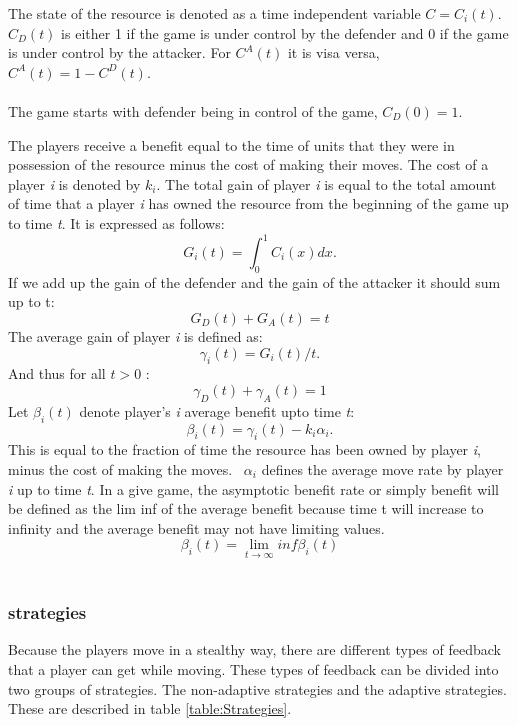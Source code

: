The state of the resource is denoted as a time independent variable $C=C_{i}(t)$. 
$C_{D}(t)$ is either 1 if the game is under control by the defender and 0 if the game is under control by the attacker. For $C^{A}(t)$ it is visa versa, $C^{A}(t)= 1 - C^{D}(t)$.\\ \\
The game starts with defender being in control of the game, $C_{D}(0)= 1$. 

The players receive a benefit equal to the time of units that they were in possession of the resource minus the cost of making their moves. The cost of a player \textit{i} is denoted by $k_{i}$. 
The total gain of player \textit{i} is equal to the total amount of time that a player \textit{i} has owned the resource from the beginning of the game up to time \textit{t}. It is expressed as follows:
\begin{equation}\label{first}
G_{i}(t) = \int_0^1 \! C_{i}(x) dx.
\end{equation}
If we add up the gain of the defender and the gain of the attacker it should sum up to t:
\begin{equation}\label{first}
G_{D}(t) + G_{A}(t) = t
\end{equation}
The average gain of player \textit{i} is defined as:
\begin{equation}\label{first}
\gamma_{i}(t) = G_{i}(t)/t.
\end{equation}
And thus for all $t > 0$ :
\begin{equation}\label{first}
\gamma_{D}(t) + \gamma_{A}(t) = 1
\end{equation}
Let $\beta_{i}(t)$ denote player's \textit{i} average benefit upto time \textit{t}:
\begin{equation}\label{first}
\beta_{i}(t) = \gamma_{i}(t) - k_{i}\alpha_{i}.
\end{equation}
This is equal to the fraction of time the resource has been owned by player \textit{i}, minus the cost of making the moves. ~$ \alpha_{i}$ defines the average move rate by player \textit{i} up to time \textit{t}.
In a give game, the asymptotic benefit rate or simply benefit will be defined as the lim inf of the average benefit because time t will increase to infinity and the average benefit may not have limiting values.
\[ \beta_{i}(t)  = \lim_{t \to \infty} inf \beta_{i}(t)  \]
\\


\subsubsection{strategies}
Because the players move in a stealthy way, there are different types of feedback that a player can get while moving. These types of feedback can be divided into two groups of strategies. The non-adaptive strategies and the adaptive strategies. These are described in table \ref{table:Strategies}. \\

